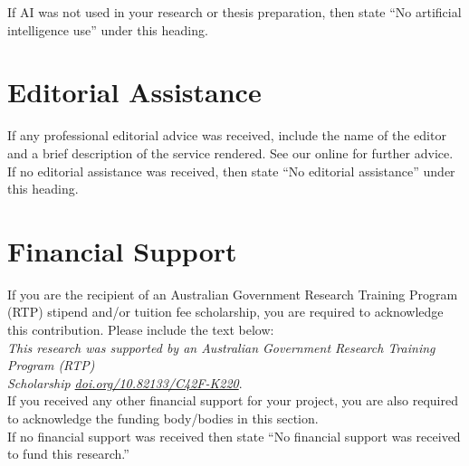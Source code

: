 \begin{instructional}
    \noindent
    If AI was not used in your research or thesis preparation, then state ``No artificial intelligence use'' under this heading. 

\end{instructional}





\section*{Editorial Assistance}

\begin{instructional}

    If any professional editorial advice was received, include the name of the editor and a brief description of the service rendered. See our online \href{https://my.uq.edu.au/node/1707/4}{\color{blue}{Thesis Preparation Guide}} for further advice. If no editorial assistance was received, then state ``No editorial assistance'' under this heading.
    
    
\end{instructional}





\section*{Financial Support}

\begin{instructional}

    If you are the recipient of an Australian Government Research Training Program (RTP) stipend and/or tuition fee scholarship, you are required to acknowledge this contribution. Please include the text below:\\

    \noindent
    \textit{This research was supported by an Australian Government Research Training Program (RTP)\\ Scholarship \href{https://doi.org/10.82133/C42F-K220}{doi.org/10.82133/C42F-K220}}.\\
    
    \noindent
    If you received any other financial support for your project, you are also required to acknowledge the funding body/bodies in this section.\\
    
    \noindent
    If no financial support was received then state ``No financial support was received to fund this research.''

    
    
\end{instructional}

